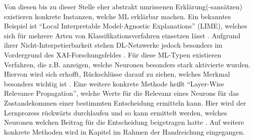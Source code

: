  Von diesen bis zu dieser Stelle eher abstrakt umrissenen Erklärung(-sansätzen) existieren konkrete Instanzen, welche ML erklärbar machen. Ein bekanntes Beispiel ist \enquote{Local Interpretable Model-Agnostic Explanations} (LIME), welches sich für mehrere Arten von Klassifikationsverfahren einsetzen lässt \cite{ribeiro2016should}. Aufgrund ihrer Nicht-Interpetierbarkeit stehen DL-Netzwerke jedoch besonders im Vordergrund des XAI-Forschungsfeldes \cite{holzinger2018machine}. Für diese ML-Typen existieren Verfahren, die z.B. anzeigen, welche Neuronen besonders stark aktivierte wurden. Hiervon wird sich erhofft, Rückschlüsse darauf zu ziehen, welches Merkmal besonders wichtig ist \cite{xu2019explainable}. Eine weitere konkrete Methode heißt \enquote{Layer-Wise Relevance Propagation}, welche Werte für die Relevanz eines Neurons für das Zustandekommen einer bestimmten Entscheidung ermitteln kann. Hier wird der Lernprozess rückwärts durchlaufen und so kann ermittelt werden, welches Neuronen welchen Beitrag für die Entscheidung beigetragen hatte \cite{montavon2019layer}.
Auf weitere konkrete Methoden wird in Kapitel  im Rahmen der Handreichung eingegangen.